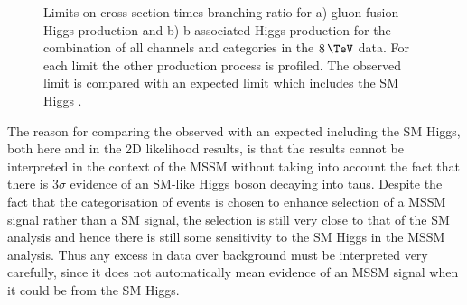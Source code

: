\begin{figure}[tbh]
\caption[Limits on cross section times branching ratio for a) gluon fusion Higgs
production and b) b-associated Higgs production for the combination of all
channels and categories in the $8\,\TeV$ data.]{Limits on cross section times branching ratio for a) gluon fusion Higgs
production and b) b-associated Higgs production for the combination of all
channels and categories in the $8\,\TeV$ data. For each limit the other production process is
profiled. The observed limit is compared with an expected limit which includes
the \ac{SM} Higgs \cite{HIG-13-021}.}
\label{fig:mssmModelIndependent}
\end{figure}

The reason for comparing the observed with an expected including the \ac{SM}
Higgs, both here and in the 2D likelihood results, 
is that the results cannot be interpreted in the context of the \ac{MSSM} without taking into account
the fact that there is $3\sigma$ evidence of an \ac{SM}-like Higgs boson decaying
into taus. Despite the fact that the categorisation of events is chosen to
enhance selection of a \ac{MSSM} signal rather than a \ac{SM} signal, the
selection is still very close to that of the \ac{SM} analysis and hence there is
still some sensitivity to the \ac{SM} Higgs in the \ac{MSSM} analysis. Thus any
excess in data over background must be interpreted very carefully, since it
does not automatically mean evidence of an \ac{MSSM} signal when it could be
from the \ac{SM} Higgs. 

